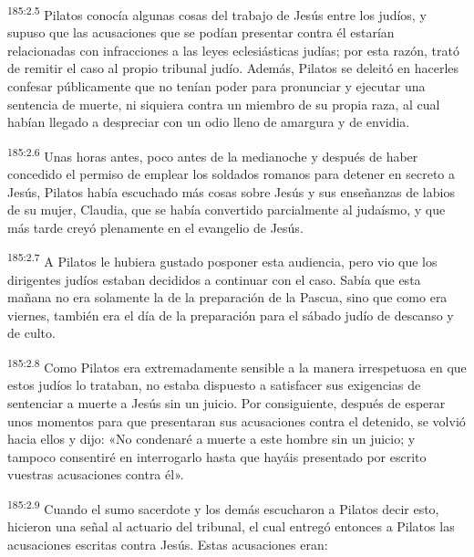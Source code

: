 \par 
\textsuperscript{185:2.5} Pilatos conocía algunas cosas del trabajo de Jesús entre los judíos, y supuso que las acusaciones que se podían presentar contra él estarían relacionadas con infracciones a las leyes eclesiásticas judías; por esta razón, trató de remitir el caso al propio tribunal judío. Además, Pilatos se deleitó en hacerles confesar públicamente que no tenían poder para pronunciar y ejecutar una sentencia de muerte, ni siquiera contra un miembro de su propia raza, al cual habían llegado a despreciar con un odio lleno de amargura y de envidia.

\par 
\textsuperscript{185:2.6} Unas horas antes, poco antes de la medianoche y después de haber concedido el permiso de emplear los soldados romanos para detener en secreto a Jesús, Pilatos había escuchado más cosas sobre Jesús y sus enseñanzas de labios de su mujer, Claudia, que se había convertido parcialmente al judaísmo, y que más tarde creyó plenamente en el evangelio de Jesús.

\par 
\textsuperscript{185:2.7} A Pilatos le hubiera gustado posponer esta audiencia, pero vio que los dirigentes judíos estaban decididos a continuar con el caso. Sabía que esta mañana no era solamente la de la preparación de la Pascua, sino que como era viernes, también era el día de la preparación para el sábado judío de descanso y de culto.

\par 
\textsuperscript{185:2.8} Como Pilatos era extremadamente sensible a la manera irrespetuosa en que estos judíos lo trataban, no estaba dispuesto a satisfacer sus exigencias de sentenciar a muerte a Jesús sin un juicio. Por consiguiente, después de esperar unos momentos para que presentaran sus acusaciones contra el detenido, se volvió hacia ellos y dijo: «No condenaré a muerte a este hombre sin un juicio; y tampoco consentiré en interrogarlo hasta que hayáis presentado por escrito vuestras acusaciones contra él».

\par 
\textsuperscript{185:2.9} Cuando el sumo sacerdote y los demás escucharon a Pilatos decir esto, hicieron una señal al actuario del tribunal, el cual entregó entonces a Pilatos las acusaciones escritas contra Jesús. Estas acusaciones eran:

